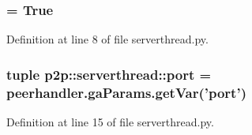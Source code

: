 \subsubsection{ = True\hspace{0.3cm}{\tt  [static]}}\label{namespacep2p_1_1serverthread_86324e3ffadc94174b52c3f998e2b869}




Definition at line 8 of file serverthread.py.
\subsubsection{\setlength{\rightskip}{0pt plus 5cm}tuple {\bf p2p::serverthread::port} = peerhandler.gaParams.getVar('{\bf port}')\hspace{0.3cm}{\tt  [static]}}\label{namespacep2p_1_1serverthread_6f20487b86cfae444be4a612f5ea4d93}




Definition at line 15 of file serverthread.py.